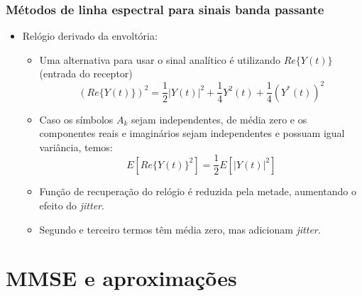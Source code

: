 \begin{frame}
	\frametitle{Métodos de linha espectral para sinais banda passante}
	\begin{itemize}
		\item Relógio derivado da envoltória:
		\begin{itemize}
			\item Uma alternativa para usar o sinal analítico é utilizando $Re\{Y(t)\}$ (entrada do receptor)
			\begin{equation*}
			\left( Re\{Y(t)\} \right)^2 = \frac{1}{2}\left|Y(t)\right|^2 + \frac{1}{4}Y^2(t) + \frac{1}{4}\left(Y^*(t)\right)^2 \label{eq:real_signal}
			\end{equation*}
			\item Caso os símbolos $A_k$ sejam independentes, de média zero e os componentes reais e imaginários sejam independentes e possuam igual variância, temos:
			\begin{equation*}
			E[Re\{Y(t)\}^2] = \frac{1}{2}E[|Y(t)|^2]
			\end{equation*}
			
			\item  Função de recuperação do relógio é reduzida pela metade, aumentando o efeito do \textit{jitter}.
			\item Segundo e terceiro termos têm média zero, mas adicionam \textit{jitter}.
			
		\end{itemize}
		
	\end{itemize}
\end{frame}


\section{MMSE e aproximações}

